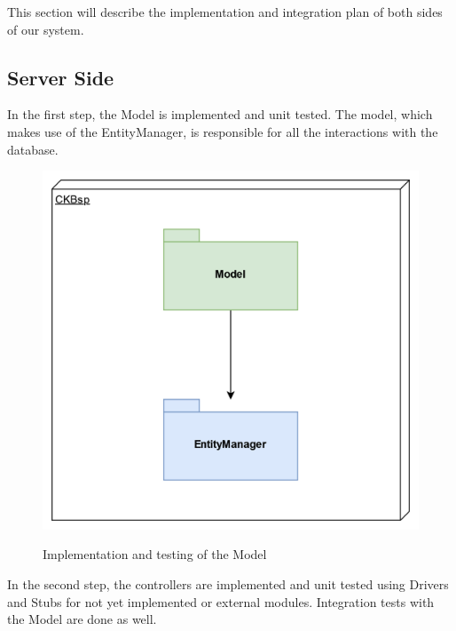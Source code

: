 \documentclass{Configuration_Files/Template}
\begin{document}
This section will describe the implementation and integration plan of both sides of our system.

\subsection{Server Side}

In the first step, the Model is implemented and unit tested. The model, which makes use of the EntityManager, is responsible for all the interactions with the database.

\begin{figure}[H]
\centering
\includegraphics[scale = 0.65]{Images/diagrams/ImplementationPlan_SS_First.png}\\
\caption{Implementation and testing of the Model}
\end{figure}

In the second step, the controllers are implemented and unit tested using Drivers and Stubs for not yet implemented or external modules. Integration tests with the Model are done as well.
\end{document}
